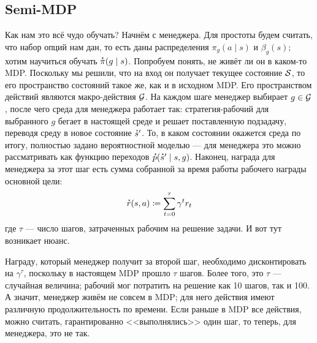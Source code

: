 
\subsection{Semi-MDP}

Как нам это всё чудо обучать? Начнём с менеджера. Для простоты будем считать, что набор опций нам дан, то есть даны распределения $\pi_g(a \mid s)$ и $\beta_g(s)$; хотим научиться обучать $\accentset{\star}{\pi}(g \mid s)$. Попробуем понять, не живёт ли он в каком-то MDP. Поскольку мы решили, что на вход он получает текущее состояние $\mathcal{S}$, то его пространство состояний такое же, как и в исходном MDP. Его пространством действий являются макро-действия $\mathcal{G}$. На каждом шаге менеджер выбирает $g \in \mathcal{G}$, после чего среда для менеджера работает так: стратегия-рабочий для выбранного $g$ бегает в настоящей среде и решает поставленную подзадачу, переводя среду в новое состояние $\accentset{\star}{s}'$. То, в каком состоянии окажется среда по итогу, полностью задано вероятностной моделью --- для менеджера это можно рассматривать как функцию переходов $\accentset{\star}{p}(\accentset{\star}{s}' \mid s, g)$. Наконец, награда для менеджера за этот шаг есть сумма собранной за время работы рабочего награды основной цели:
\begin{equation}\label{managerreward}
\accentset{\star}{r}(s, a) \coloneqq \sum_{t=0}^{\tau} \gamma^t r_t
\end{equation}
где $\tau$ --- число шагов, затраченных рабочим на решение задачи. И вот тут возникает нюанс.

Награду, который менеджер получит за второй шаг, необходимо дисконтировать на $\gamma^{\tau}$, поскольку в настоящем MDP прошло $\tau$ шагов. Более того, это $\tau$ --- случайная величина; рабочий мог потратить на решение как 10 шагов, так и 100. А значит, менеджер живём не совсем в MDP; для него действия имеют различную продолжительность по времени. Если раньше в MDP все действия, можно считать, гарантированно <<выполнялись>> один шаг, то теперь, для менеджера, это не так.

